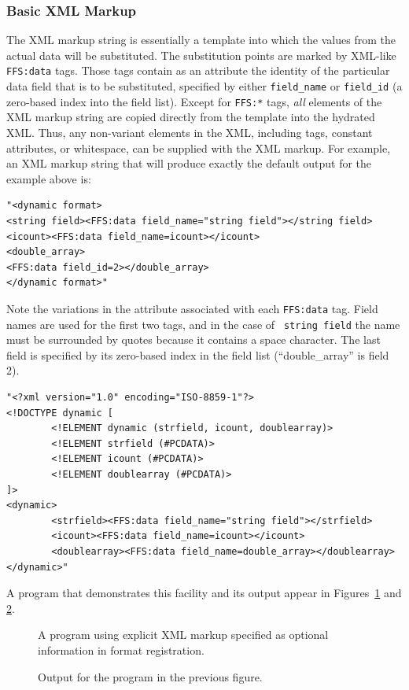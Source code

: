 \subsubsection{Basic XML Markup}
The XML markup string is essentially a template into which the values from
the actual data will be substituted.  The substitution points are marked by
XML-like {\tt FFS:data} tags.  Those tags contain as an attribute the
identity of the particular data field that is to be substituted, specified
by either {\tt field\_name} or {\tt field\_id} (a zero-based index into the
field list).  Except for {\tt FFS:*} tags, {\it all} elements of the XML
markup string are copied directly from the template into the hydrated XML.
Thus, any non-variant elements in the XML, including tags, constant
attributes, or whitespace, can be supplied with the XML markup.  For example,
an XML markup string that will produce exactly the default output for the
example above is:
\begin{verbatim}
"<dynamic format>
<string field><FFS:data field_name="string field"></string field>
<icount><FFS:data field_name=icount></icount>
<double_array>
<FFS:data field_id=2></double_array>
</dynamic format>"
\end{verbatim}
Note the variations in the attribute associated with each {\tt FFS:data}
tag.  Field names are used for the first two tags, and in the case of {\tt
string field} the name must be surrounded by quotes because it contains a
space character.  The last field is specified by its zero-based index in the
field list (``double\_array'' is field 2).


\begin{verbatim}
"<?xml version="1.0" encoding="ISO-8859-1"?>
<!DOCTYPE dynamic [
        <!ELEMENT dynamic (strfield, icount, doublearray)>
        <!ELEMENT strfield (#PCDATA)>
        <!ELEMENT icount (#PCDATA)>
        <!ELEMENT doublearray (#PCDATA)>
]>
<dynamic>
        <strfield><FFS:data field_name="string field"></strfield>
        <icount><FFS:data field_name=icount></icount>
        <doublearray><FFS:data field_name=double_array></doublearray>
</dynamic>"
\end{verbatim}
A program that demonstrates this facility and its output appear in
Figures~\ref{xml_fig} and \ref{xml_output}.
\begin{figure}[p]
\begin{quote}
\end{quote}
\caption{A program using explicit XML markup specified as optional
information in format registration.\label{xml_fig}}
\end{figure}
\begin{figure}[t]
\begin{quote}
\end{quote}
\caption{Output for the program in the previous figure.\label{xml_output}}
\end{figure}
